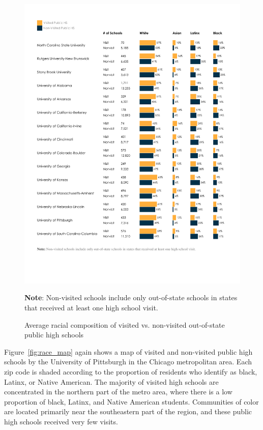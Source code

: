\documentclass{article}
\begin{document}
\begin{figure}[!ht]
    \centering
    \includegraphics[width=\textwidth, trim={1.25cm, 4cm, 1cm, 1.5cm}, clip]{assets/graphs/race_graph_pub_out.pdf}
    \begin{flushleft}\textbf{Note}: Non-visited schools include only out-of-state schools in states that received at least one high school visit.\end{flushleft}
    \caption{Average racial composition of visited vs. non-visited out-of-state public high schools}
    \label{fig:race_graph_pub_out}
\end{figure}

Figure~\ref{fig:race_map} again shows a map of visited and non-visited public high schools by the University of Pittsburgh in the Chicago metropolitan area. Each zip code is shaded according to the proportion of residents who identify as black, Latinx, or Native American. The majority of visited high schools are concentrated in the northern part of the metro area, where there is a low proportion of black, Latinx, and Native American students. Communities of color are located primarily near the southeastern part of the region, and these public high schools received very few visits.
\end{document}
